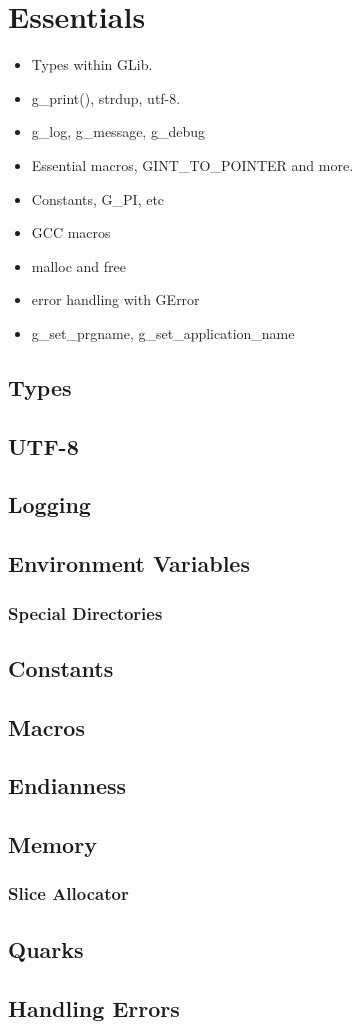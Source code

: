 \chapter{Essentials}

\begin{itemize}
\item Types within GLib.
\item g\_print(), strdup, utf-8.
\item g\_log, g\_message, g\_debug
\item Essential macros, GINT\_TO\_POINTER and more.
\item Constants, G\_PI, etc
\item GCC macros
\item malloc and free
\item error handling with GError
\item g\_set\_prgname, g\_set\_application\_name
\end{itemize}

\section{Types}

\section{UTF-8}

\section{Logging}

\section{Environment Variables}
\subsection{Special Directories}

\section{Constants}

\section{Macros}

\section{Endianness}

\section{Memory}
\subsection{Slice Allocator}

\section{Quarks}

\section{Handling Errors}

